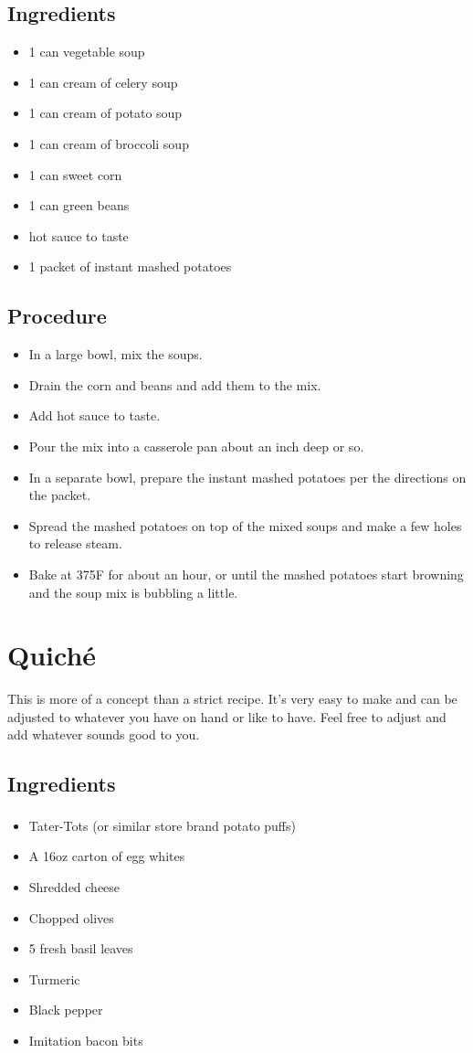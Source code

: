 \documentclass[10pt, openany]{book}
\begin{document}
\subsection{Ingredients}
\begin{itemize}
  \item 1 can vegetable soup
  \item 1 can cream of celery soup
  \item 1 can cream of potato soup
  \item 1 can cream of broccoli soup
  \item 1 can sweet corn
  \item 1 can green beans
  \item hot sauce to taste
  \item 1 packet of instant mashed potatoes
\end{itemize}
\subsection{Procedure}
\begin{itemize}
  \item In a large bowl, mix the soups.
  \item Drain the corn and beans and add them to the mix.
  \item Add hot sauce to taste.
  \item Pour the mix into a casserole pan about an inch deep or so.
  \item In a separate bowl, prepare the instant mashed potatoes per the directions on the packet.
  \item Spread the mashed potatoes on top of the mixed soups and make a few holes to release steam.
  \item Bake at 375\degree{}F for about an hour, or until the mashed potatoes start browning and the soup mix is bubbling a little.
\end{itemize}

\section{Quich\'e}
This is more of a concept than a strict recipe.  It's very easy to make and can be adjusted to whatever you have on hand or like to have.  Feel free to adjust and add whatever sounds good to you.
\subsection{Ingredients}
\begin{itemize}
  \item Tater-Tots\textsuperscript{\textregistered} (or similar store brand potato puffs)
  \item A 16oz carton of egg whites
  \item Shredded cheese
  \item Chopped olives
  \item 5 fresh basil leaves
  \item Turmeric
  \item Black pepper
  \item Imitation bacon bits
\end{itemize}
\end{document}
